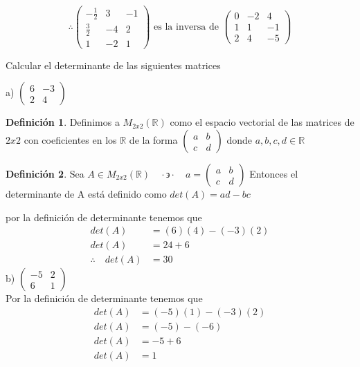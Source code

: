 \documentclass[letterpaper]{article}
\newcommand{\tq}{ \quad \cdot  \backepsilon \cdot \quad }
\newcommand{\R}{\mathds{R}}
\renewcommand{\*}{\cdot}
\theoremstyle{definition}
\newtheorem{definition}{Definición}
\begin{document}
	\[ \therefore \begin{pmatrix}
	-\frac{1}{2} & 3 & -1\\
	\frac{3}{2} & -4 & 2\\
	1 & -2 & 1
	\end{pmatrix} \text{ es la inversa de } \begin{pmatrix} 0 & -2 & 4 \\ 1 & 1 & -1 \\ 2 & 4 & -5 \end{pmatrix}  \]
	\begin{ejercicio}{14}
		Calcular el determinante de las siguientes matrices 
	\end{ejercicio}
	\noindent a) $\begin{pmatrix} 6 & -3 \\ 2 & 4 \end{pmatrix}$\\
	\begin{definition}
		Definimos a $ M_{2x2}(\R) $ como el espacio vectorial de las matrices de $ 2x2 $ con coeficientes en los $ \R $ de la forma $ 		\begin{pmatrix}
		a& b\\
		c& d
		\end{pmatrix} $ donde $ a,b,c,d \in \R $
	\end{definition}
	\begin{definition}
		Sea $ A \in M_{2x2}(\R) \tq a = \begin{pmatrix}
		a& b\\
		c& d
		\end{pmatrix}$ Entonces el determinante de A está definido como $  det(A) = ad -bc $
	\end{definition}
	por la definición de determinante tenemos que
	\begin{align*}
		det(A) &= (6)(4) - (-3)(2)\\
		det(A) &= 24 +6\\
		\therefore \quad det(A) &= 30
	\end{align*}
	b) $\begin{pmatrix} -5 & 2 \\ 6 & 1 \end{pmatrix}$ \\
	Por la definición de determinante tenemos que 
	\begin{align*}
		det(A) &= (-5)(1)-(-3)(2)\\
		det(A) &= (-5)-(-6)\\
		det(A) &= -5+6\\
		det(A) &= 1
	\end{align*}
\end{document}
